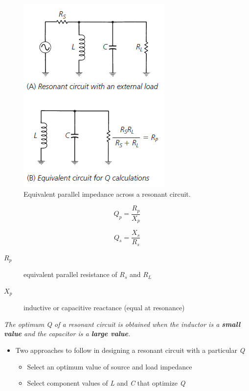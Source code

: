 \begin{figure} [H]
	\centering
	\includegraphics[width=0.5\linewidth]{graphics/24.png}
	\caption{Equivalent parallel impedance across a resonant circuit.}
	\label{fig:24}
\end{figure}

\begin{equation}
Q_p = \dfrac{R_p}{X_p}
\end{equation}

\begin{equation}
Q_s = \dfrac{X_s}{R_s}
\end{equation}

\begin{description}
	\item[$R_p$] equivalent parallel resistance of $R_s$ and $R_L$
	\item[$X_p$] inductive or capacitive reactance (equal at resonance)
\end{description}

\noindent\textit{The optimum Q of a resonant circuit is obtained when the inductor
	is a \textbf{small value} and the capacitor is a \textbf{large value}.}
\newpage
\begin{itemize}
	\item Two approaches to follow in designing a resonant circuit with a particular \textit{Q}
	\begin{itemize}
		\item Select an optimum value of source and load impedance
		\item Select component values of \textit{L} and \textit{C} that	optimize \textit{Q}
	\end{itemize}
\end{itemize}


